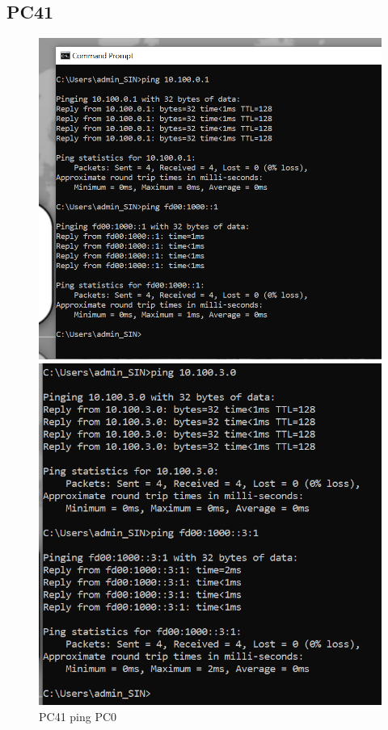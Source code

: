 \documentclass{article}
\begin{document}
\subsection{PC41}
\begin{figure}[!htp]
  \centering
  \begin{minipage}[b]{0.3\textwidth}
    \includegraphics[width=\textwidth]{Arbeitsergebnisse/PC41/pc41_ping_pc0.png}
    \caption{PC41 ping PC0}
  \end{minipage}
  \hspace{0.8cm}
  \begin{minipage}[b]{0.3\textwidth}
    \includegraphics[width=\textwidth]{Arbeitsergebnisse/PC41/pc41_ping_net3.png}

\end{minipage}
\end{figure}
\end{document}
